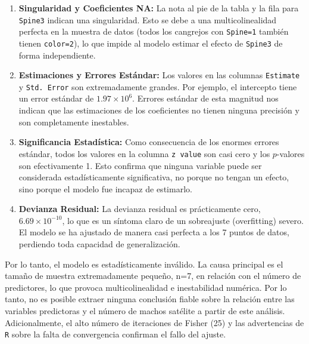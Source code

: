 \begin{enumerate}
    \item \textbf{Singularidad y Coeficientes NA:} La nota al pie de la tabla y la fila para \texttt{Spine3} indican una singularidad. Esto se debe a una multicolinealidad perfecta en la muestra de datos (todos los cangrejos con \texttt{Spine=1} también tienen \texttt{color=2}), lo que impide al modelo estimar el efecto de \texttt{Spine3} de forma independiente.

    \item \textbf{Estimaciones y Errores Estándar:} Los valores en las columnas \texttt{Estimate} y \texttt{Std. Error} son extremadamente grandes. Por ejemplo, el intercepto tiene un error estándar de $1.97 \times 10^6$. Errores estándar de esta magnitud nos indican que las estimaciones de los coeficientes no tienen ninguna precisión y son completamente inestables.

    \item \textbf{Significancia Estadística:} Como consecuencia de los enormes errores estándar, todos los valores en la columna \texttt{z value} son casi cero y los $p$-valores son efectivamente 1. Esto confirma que ninguna variable puede ser considerada estadísticamente significativa, no porque no tengan un efecto, sino porque el modelo fue incapaz de estimarlo.

    \item \textbf{Devianza Residual:} La devianza residual es prácticamente cero, $6.69 \times 10^{-10}$, lo que es un síntoma claro de un sobreajuste (overfitting) severo. El modelo se ha ajustado de manera casi perfecta a los 7 puntos de datos, perdiendo toda capacidad de generalización.
\end{enumerate}

\begin{tcolorbox}
Por lo tanto, el modelo es estadísticamente inválido. La causa principal es el tamaño de muestra extremadamente pequeño, n=7, en relación con el número de predictores, lo que provoca multicolinealidad e inestabilidad numérica. Por lo tanto, no es posible extraer ninguna conclusión fiable sobre la relación entre las variables predictoras y el número de machos satélite a partir de este análisis. Adicionalmente, el alto número de iteraciones de Fisher (25) y las advertencias de \texttt{R} sobre la falta de convergencia confirman el fallo del ajuste.
\end{tcolorbox}

\newpage

